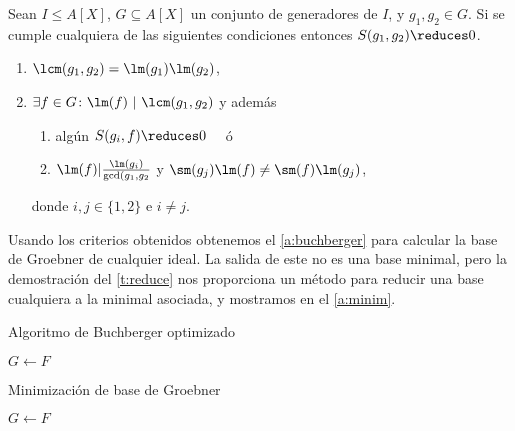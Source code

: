 \begin{teorema}\label{t:criterios}
    Sean $I\le A[X]$, $G\subseteq A[X]$ un conjunto de generadores de $I$, y $g_1,g_2 \in G$. Si se cumple cualquiera de las siguientes condiciones entonces  $S(g_1,g_2)\reduces 0$.
    \begin{enumerate}
        \item $\lcm(g_1,g_2) = \lm(g_1)\lm(g_2)$,
        \item $\exists f\in G \colon \lm(f)\ \vert\ \lcm(g_1,g_2)$ y además
        \begin{enumerate}
            \item algún $S(g_i,f)\reduces 0\quad$ ó
            \item $\lm(f)\vert \frac{\lm(g_i)}{\gcd(g_1,g_2}$ y $\sm(g_j)\lm(f) \neq \sm(f)\lm(g_j)$,
        \end{enumerate}
        donde $i,j\in\{1,2\}$ e $i\neq j$.
    \end{enumerate}
    
\end{teorema}

Usando los criterios obtenidos obtenemos el \autoref{a:buchberger} para calcular la base de Groebner de cualquier ideal. La salida de este no es una base minimal, pero la demostración del \autoref{t:reduce} nos proporciona un método para reducir una base cualquiera a la minimal asociada, y mostramos en el \autoref{a:minim}.\newline


 
\begin{algorithm}[hbt!]
    \caption{Algoritmo de Buchberger optimizado}\label{a:buchberger}

    $G\gets F$\;


\end{algorithm}

\begin{algorithm}[hbt!]
    \caption{Minimización de base de Groebner}\label{a:minim}

    $G\gets F$\;

\end{algorithm}

